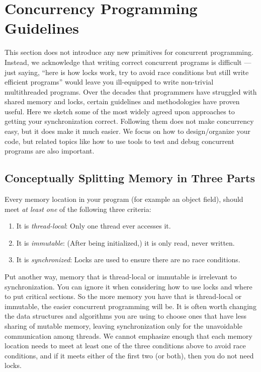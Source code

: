 \documentclass[10pt]{article}
\begin{document}
\section{Concurrency Programming Guidelines}
\label{sec:guidelines}

This section does not introduce any new primitives for concurrent
programming.  Instead, we acknowledge that writing correct concurrent
programs is difficult --- just saying, ``here is how locks work, try
to avoid race conditions but still write efficient programs'' would
leave you ill-equipped to write non-trivial multithreaded programs.
Over the decades that programmers have struggled with shared memory
and locks, certain guidelines and methodologies have proven useful.
Here we sketch some of the most widely agreed upon approaches to
getting your synchronization correct.  Following them does not make
concurrency easy, but it does make it much easier.  We focus on how to
design/organize your code, but related topics like how to use tools to
test and debug concurrent programs are also important.

\subsection{Conceptually Splitting Memory in Three Parts}

Every memory location in your program (for example an object field),
should meet \emph{at least one} of the following three criteria:

\begin{enumerate}
\item It is \emph{thread-local}: Only one thread ever accesses it.
\item It is \emph{immutable}: (After being initialized,) it is only
  read, never written.
\item It is \emph{synchronized}: Locks are used to ensure there are no
  race conditions.
\end{enumerate}

Put another way, memory that is thread-local or immutable is
irrelevant to synchronization.  You can ignore it when considering how
to use locks and where to put critical sections.  So the more memory
you have that is thread-local or immutable, the easier concurrent
programming will be.  It is often worth changing the data structures
and algorithms you are using to choose ones that have less sharing of
mutable memory, leaving synchronization only for the unavoidable
communication among threads.  We cannot emphasize enough that each
memory location needs to meet at least one of the three conditions
above to avoid race conditions, and if it meets either of the first
two (or both), then you do not need locks.
\end{document}
